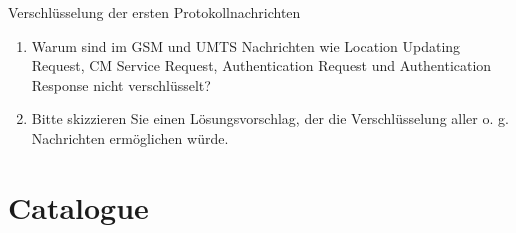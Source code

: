 \documentclass{article}
\begin{document}
\begin{exercise}{Verschlüsselung der ersten Protokollnachrichten}
  \begin{enumerate}
    \item Warum sind im GSM und UMTS Nachrichten wie Location Updating Request, CM Service Request, Authentication Request und Authentication Response nicht verschlüsselt?
    \item Bitte skizzieren Sie einen Lösungsvorschlag, der die Verschlüsselung aller o. g. Nachrichten ermöglichen würde.
  \end{enumerate}
 
   \begin{solution}
   \end{solution}
 \end{exercise}
 


%

%

%



\section{Catalogue}
\end{document}
